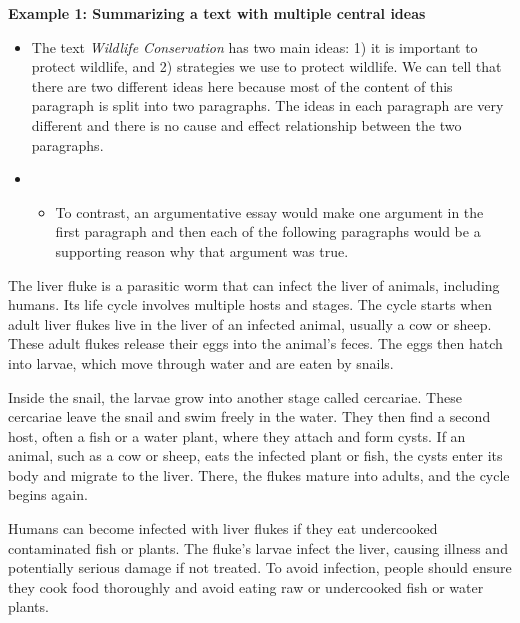 \documentclass[12pt]{article}
\begin{document}
\begin{tcolorbox}[colframe=black!60, colback=white, 
coltitle=black, colbacktitle=black!15, fonttitle=\bfseries\Large, 
title=Examples, halign title=center, left=10pt, right=10pt, top=10pt, bottom=15pt]

\textbf{Example 1: Summarizing a text with multiple central ideas}
\begin{itemize}

    \item The text \textit{Wildlife Conservation} has two main ideas: 1) it is important to protect wildlife, and 2) strategies we use to protect wildlife. We can tell that there are two different ideas here because most of the content of this paragraph is split into two paragraphs. The ideas in each paragraph are very different and there is no cause and effect relationship between the two paragraphs. 
    \item 
    \begin{itemize}
        \item To contrast, an argumentative essay would make one argument in the first paragraph and then each of the following paragraphs would be a supporting reason why that argument was true. 
    \end{itemize}
    \end{itemize}
   
\end{tcolorbox}

\begin{tcolorbox}[colframe=black!60, colback=white, 
coltitle=black, colbacktitle=black!15, fonttitle=\bfseries\Large, 
title=Text 1: The Life Cycle of the Liver Fluke, halign title=center, left=10pt, right=10pt, top=10pt, bottom=15pt]
The liver fluke is a parasitic worm that can infect the liver of animals, including humans. Its life cycle involves multiple hosts and stages. The cycle starts when adult liver flukes live in the liver of an infected animal, usually a cow or sheep. These adult flukes release their eggs into the animal’s feces. The eggs then hatch into larvae, which move through water and are eaten by snails.

Inside the snail, the larvae grow into another stage called cercariae. These cercariae leave the snail and swim freely in the water. They then find a second host, often a fish or a water plant, where they attach and form cysts. If an animal, such as a cow or sheep, eats the infected plant or fish, the cysts enter its body and migrate to the liver. There, the flukes mature into adults, and the cycle begins again.

Humans can become infected with liver flukes if they eat undercooked contaminated fish or plants. The fluke's larvae infect the liver, causing illness and potentially serious damage if not treated. To avoid infection, people should ensure they cook food thoroughly and avoid eating raw or undercooked fish or water plants.
\end{tcolorbox}
\end{document}
